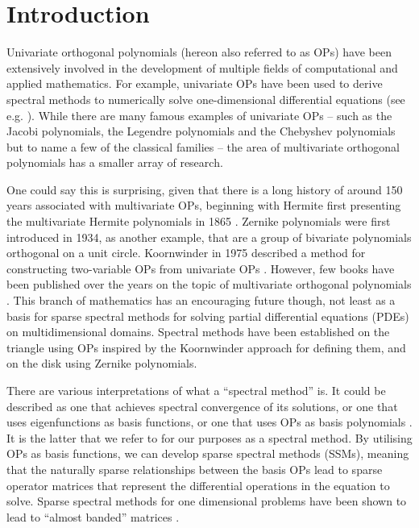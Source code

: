 
\chapter{Introduction}

Univariate orthogonal polynomials (hereon also referred to as OPs) have been extensively involved in the development of multiple fields of computational and applied mathematics. For example, univariate OPs have been used to derive spectral methods to numerically solve one-dimensional differential equations (see e.g. \cite{trefethen2000spectral, boyd2001chebyshev, mason2002chebyshev, shen2011spectral, olver2013fast} ). While there are many famous examples of univariate OPs -- such as the Jacobi polynomials, the Legendre polynomials and the Chebyshev polynomials but to name a few of the classical families \cite[Section 18.3]{DLMF} -- the area of multivariate orthogonal polynomials has a smaller array of research. 

One could say this is surprising, given that there is a long history of around 150 years associated with multivariate OPs, beginning with Hermite first presenting the multivariate Hermite polynomials in 1865 \cite{appel1926fonctions, ismail2017review}. Zernike polynomials \cite{zernike1934diffraction} were first introduced in 1934, as another example, that are a group of bivariate polynomials orthogonal on a unit circle. Koornwinder in 1975 described a method for constructing two-variable OPs from univariate OPs \cite{koornwinder1975two}. However, few books have been published over the years on the topic of multivariate orthogonal polynomials \cite{dunkl2014orthogonal}. This branch of mathematics has an encouraging future though, not least as a basis for sparse spectral methods for solving partial differential equations (PDEs) on multidimensional domains. Spectral methods have been established on the triangle \cite{olver2019triangle} using OPs inspired by the Koornwinder approach for defining them, and on the disk \cite{vasil2016tensor} using Zernike polynomials.

There are various interpretations of what a \enquote{spectral method} is. It could be described as one that achieves spectral convergence of its solutions, or one that uses eigenfunctions as basis functions, or one that uses OPs as basis polynomials \cite{}. It is the latter that we refer to for our purposes as a spectral method. By utilising OPs as basis functions, we can develop sparse spectral methods (SSMs), meaning that the naturally sparse relationships between the basis OPs lead to sparse operator matrices that represent the differential operations in the equation to solve. Sparse spectral methods for one dimensional problems have been shown to lead to \enquote{almost banded} matrices \cite{olver2013fast}. 

